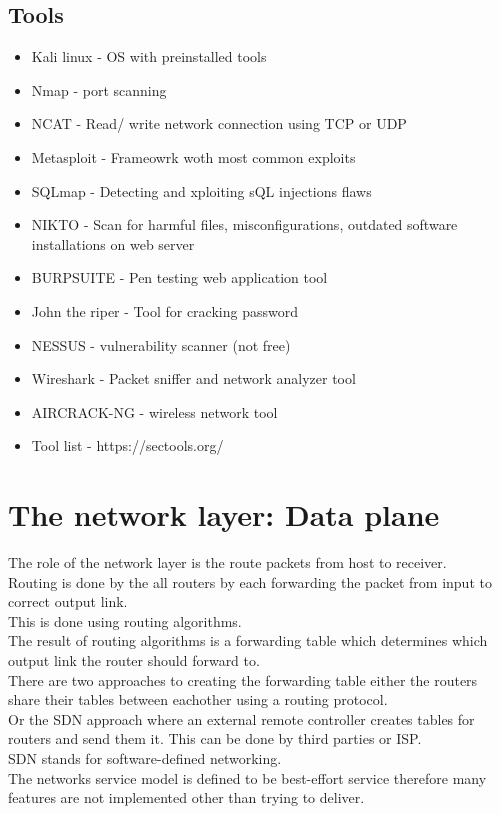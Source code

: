 \documentclass[12pt, a4paper]{article}
\begin{document}
		\subsection{Tools}
			\begin{itemize}
				\item Kali linux - OS with preinstalled tools
				\item Nmap - port scanning
				\item NCAT - Read/ write network connection using TCP or UDP
				\item Metasploit - Frameowrk woth most common exploits
				\item SQLmap - Detecting and xploiting sQL injections flaws
				\item NIKTO - Scan for harmful files, misconfigurations, outdated software installations on web server
				\item BURPSUITE - Pen testing web application tool
				\item John the riper - Tool for cracking password
				\item NESSUS - vulnerability scanner (not free)
				\item Wireshark - Packet sniffer and network analyzer tool
				\item AIRCRACK-NG - wireless network tool
				\item Tool list - https://sectools.org/
			\end{itemize}
	\section{The network layer: Data plane}
		The role of the network layer is the route packets from host to receiver.\\
		Routing is done by the all routers by each forwarding the packet from input to correct output link.\\
		This is done using routing algorithms.\\
		The result of routing algorithms is a forwarding table which determines which output link the router should forward to.\\
		There are two approaches to creating the forwarding table either the routers share their tables between eachother using a routing protocol.\\
		Or the SDN approach where an external remote controller creates tables for routers and send them it. This can be done by third parties or ISP.\\
		SDN stands for software-defined networking.\\
		The networks service model is defined to be best-effort service therefore many features are not implemented other than trying to deliver.
\end{document}
